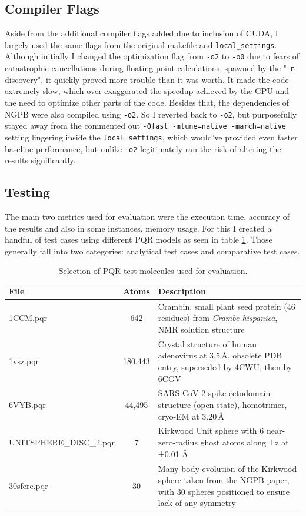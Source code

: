 \subsection{Compiler Flags}
\label{sec:evaluation-experimental-setup-compiler-flags}

Aside from the additional compiler flags added due to inclusion of CUDA, I largely used the same flags from the original makefile and \texttt{local\_settings}. 
Although initially I changed the optimization flag from \texttt{-o2} to \texttt{-o0} due to fears of catastrophic cancellations during floating point calculations, spawned by the "\texttt{-n} discovery", it quickly proved more trouble than it was worth. 
It made the code extremely slow, which over-exaggerated the speedup achieved by the GPU and the need to optimize other parts of the code. Besides that, the dependencies of NGPB were also compiled using \texttt{-o2}. 
So I reverted back to \texttt{-o2}, but purposefully stayed away from the commented out \texttt{-Ofast -mtune=native -march=native} setting lingering inside the \texttt{local\_settings}, which would've provided even faster baseline performance, but unlike \texttt{-o2} legitimately ran the risk of altering the results significantly. %

\subsection{Testing}
\label{sec:evaluation-experimental-setup-testing}

The main two metrics used for evaluation were the execution time, accuracy of the results and also in some instances, memory usage. For this I created a handful of test cases using different PQR models as seen in table \ref{tab:test-molecules}.
Those generally fall into two categories: analytical test cases and comparative test cases.

\begin{table}[htbp]
    \centering
    \begin{tabular}{lcp{8cm}}
        \toprule
        File & Atoms & Description \\
        \midrule
        1CCM.pqr & 642 & Crambin, small plant seed protein (46 residues) from \textit{Crambe hispanica}, NMR solution structure \\
        1vsz.pqr & 180{,}443 & Crystal structure of human adenovirus at 3.5\,\AA{}, obsolete PDB entry, superseded by 4CWU, then by 6CGV \\
        6VYB.pqr & 44{,}495 & SARS-CoV-2 spike ectodomain structure (open state), homotrimer, cryo-EM at 3.20\,\AA{} \\
        UNITSPHERE\_DISC\_2.pqr & 7 & Kirkwood Unit sphere with 6 near-zero-radius ghost atoms along ±z at ±0.01 Å \\
        30sfere.pqr & 30 & Many body evolution of the Kirkwood sphere taken from the NGPB paper, with 30 spheres positioned to ensure lack of any symmetry \\
        \bottomrule
    \end{tabular}
    \caption{Selection of PQR test molecules used for evaluation.}
    \label{tab:test-molecules}
\end{table}

